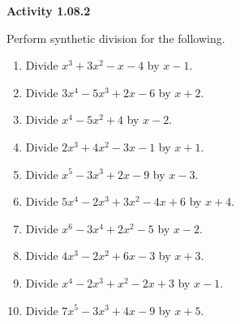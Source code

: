 \vspace{0.3ex}
\noindent\textbf{Activity 1.08.2}

\vspace{0.2ex}

Perform synthetic division for the following.
\begin{enumerate}
    \item Divide \(x^3 + 3x^2 - x - 4\) by \(x - 1\).
    \item Divide \(3x^4 - 5x^3 + 2x - 6\) by \(x + 2\).
    \item Divide \(x^4 - 5x^2 + 4\) by \(x - 2\).
    \item Divide \(2x^3 + 4x^2 - 3x - 1\) by \(x + 1\).
    \item Divide \(x^5 - 3x^3 + 2x - 9\) by \(x - 3\).
    \item Divide \(5x^4 - 2x^3 + 3x^2 - 4x + 6\) by \(x + 4\).
    \item Divide \(x^6 - 3x^4 + 2x^2 - 5\) by \(x - 2\).
    \item Divide \(4x^3 - 2x^2 + 6x - 3\) by \(x + 3\).
    \item Divide \(x^4 - 2x^3 + x^2 - 2x + 3\) by \(x - 1\).
    \item Divide \(7x^5 - 3x^3 + 4x - 9\) by \(x + 5\).
\end{enumerate}
